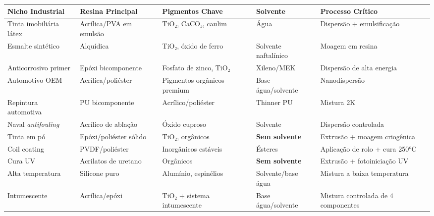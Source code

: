 \documentclass[
  12pt,
  a4paper,
  oneside,
  brazil,
  chapter=TITLE
]{article}
\begin{document}
{\def\LTcaptype{none} %
\begin{longtable}[]{@{}
  >{\raggedright\arraybackslash}p{}
  >{\raggedright\arraybackslash}p{}
  >{\raggedright\arraybackslash}p{}
  >{\raggedright\arraybackslash}p{}
  >{\raggedright\arraybackslash}p{}@{}}
\toprule\noalign{}
\begin{minipage}[b]{\linewidth}\raggedright
Nicho Industrial
\end{minipage} & \begin{minipage}[b]{\linewidth}\raggedright
Resina Principal
\end{minipage} & \begin{minipage}[b]{\linewidth}\raggedright
Pigmentos Chave
\end{minipage} & \begin{minipage}[b]{\linewidth}\raggedright
Solvente
\end{minipage} & \begin{minipage}[b]{\linewidth}\raggedright
Processo Crítico
\end{minipage} \\
\midrule\noalign{}
\endhead
\bottomrule\noalign{}
\endlastfoot
Tinta imobiliária látex & Acrílica/PVA em emulsão & TiO₂, CaCO₃, caulim
& Água & Dispersão + emulsificação \\
Esmalte sintético & Alquídica & TiO₂, óxido de ferro & Solvente
naftalínico & Moagem em resina \\
Anticorrosivo primer & Epóxi bicomponente & Fosfato de zinco, TiO₂ &
Xileno/MEK & Dispersão de alta energia \\
Automotivo OEM & Acrílica/poliéster & Pigmentos orgânicos premium & Base
água/solvente & Nanodispersão \\
Repintura automotiva & PU bicomponente & Acrílico/poliéster & Thinner PU
& Mistura 2K \\
Naval \emph{antifouling} & Acrílico de ablação & Óxido cuproso &
Solvente & Dispersão controlada \\
Tinta em pó & Epóxi/poliéster sólido & TiO₂, orgânicos & \textbf{Sem
solvente} & Extrusão + moagem criogênica \\
Coil coating & PVDF/poliéster & Inorgânicos estáveis & Ésteres &
Aplicação de rolo + cura 250°C \\
Cura UV & Acrilatos de uretano & Orgânicos & \textbf{Sem solvente} &
Extrusão + fotoiniciação UV \\
Alta temperatura & Silicone puro & Alumínio, espinélios & Solvente/base
água & Mistura a baixa temperatura \\
Intumescente & Acrílica/epóxi & TiO₂ + sistema intumescente & Base
água/solvente & Mistura controlada de 4 componentes \\
\end{longtable}
}
\end{document}
